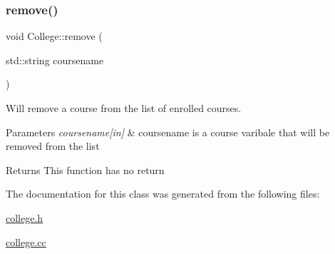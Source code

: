 \subsubsection{\texorpdfstring{remove()}{remove()}}
{\footnotesize\ttfamily void College\+::remove (\begin{DoxyParamCaption}\item[{std\+::string}]{coursename }\end{DoxyParamCaption})}



Will remove a course from the list of enrolled courses. 


\begin{DoxyParams}{Parameters}
{\em coursename\mbox{[}in\mbox{]}} & coursename is a course varibale that will be removed from the list \\
\hline
\end{DoxyParams}
\begin{DoxyReturn}{Returns}
This function has no return 
\end{DoxyReturn}


The documentation for this class was generated from the following files\+:\begin{DoxyCompactItemize}
\item 
\hyperlink{college_8h}{college.\+h}\item 
\hyperlink{college_8cc}{college.\+cc}\end{DoxyCompactItemize}
